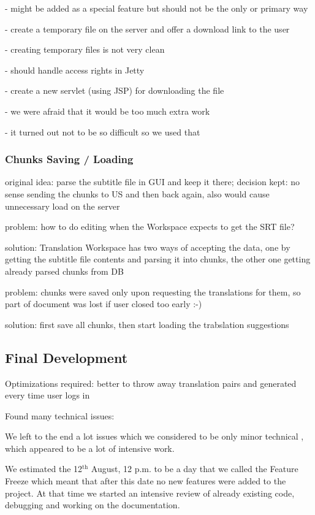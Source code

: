   - might be added as a special feature but should not be the only or primary way

- create a temporary file on the server and offer a download link to the user

  - creating temporary files is not very clean
  
  - should handle access rights in Jetty

- create a new servlet (using JSP) for downloading the file

  - we were afraid that it would be too much extra work
  
  - it turned out not to be so difficult so we used that

\subsubsection{Chunks Saving / Loading}

original idea: parse the subtitle file in GUI and keep it there; decision kept: no sense sending the chunks to US and then back again, also would cause unnecessary load on the server

problem: how to do editing when the Workspace expects to get the SRT file?

solution: Translation Workspace has two ways of accepting the data, one by getting the subtitle file contents and parsing it into chunks, the other one getting already parsed chunks from DB


problem: chunks were saved only upon requesting the translations for them, so part of document was lost if user closed too early :-)

solution: first save all chunks, then start loading the trabslation suggestions

\subsection{Final Development}
\label{subsec:final_development}

Optimizations required: better to throw away translation pairs and generated every time user logs in

Found many technical issues: %


We left to the end a lot issues which we considered to be only minor technical , which appeared to be a lot of intensive work.

We estimated the 12$^\mathrm{th}$ August, 12 p.m. to be a day that we called the Feature Freeze which meant that after this date no new features were added to the project. At that time we started an intensive review of already existing code, debugging and working on the documentation. 

